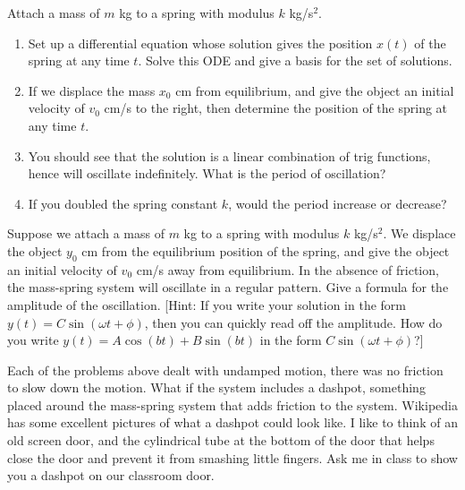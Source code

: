 \begin{problem}
 Attach a mass of $m$ kg to a spring with modulus $k$ kg/s$^2$. 
\begin{enumerate}
 \item Set up a differential equation whose solution gives the position $x(t)$ of the spring at any time $t$. Solve this ODE and give a basis for the set of solutions. 
 \item If we displace the mass $x_0$ cm from equilibrium, and give the object an initial velocity of $v_0$ cm/s to the right, then determine the position of the spring at any time $t$. %
 \item You should see that the solution is a linear combination of trig functions, hence will oscillate indefinitely. What is the period of oscillation? 
 \item If you doubled the spring constant $k$, would the period increase or decrease?

\end{enumerate}
\end{problem}


\begin{problem*}[Optional]
 Suppose we attach a mass of $m$ kg to a spring with modulus $k$ kg/s$^2$. We displace the object $y_0$ cm from the equilibrium position of the spring, and give the object an initial velocity of $v_0$ cm/s away from equilibrium. In the absence of friction, the mass-spring system will oscillate in a regular pattern. Give a formula for the amplitude of the oscillation. [Hint: If you write your solution in the form $y(t) = C\sin(\omega t+\phi)$, then you can quickly read off the amplitude. How do you write $y(t) = A\cos(bt)+B\sin(bt)$ in the form $C\sin(\omega t+\phi)$?] 
\end{problem*}

Each of the problems above dealt with undamped motion, there was no friction to slow down the motion.  What if the system includes a dashpot, something placed around the mass-spring system that adds friction to the system. Wikipedia has some excellent pictures of what a dashpot could look like.  I like to think of an old screen door, and the cylindrical tube at the bottom of the door that helps close the door and prevent it from smashing little fingers.  Ask me in class to show you a dashpot on our classroom door.


